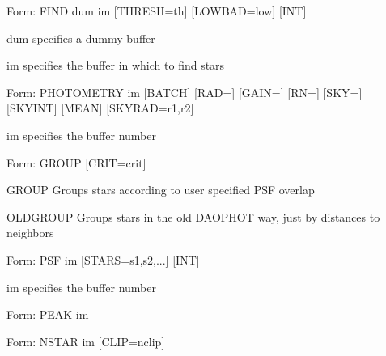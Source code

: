 {\newpage\clearpage
{}%
\begin{command}
  \item[Form: FIND dum im {[THRESH=th]} {[LOWBAD=low]} {[INT]}\hfill]{}
  \item[dum]{specifies a dummy buffer}
  \item[im]{specifies the buffer in which to find stars}
\end{command}%
\lthtmlfigureZ
\lthtmlcheckvsize\clearpage}

{\newpage\clearpage
{}%
\begin{command}
  \item[Form: PHOTOMETRY im {[BATCH]} {[RAD=]} {[GAIN=]} {[RN=]} {[SKY=]} {[SKYINT]} {[MEAN]} {[SKYRAD=r1,r2]}\hfill]{}
  \item[im]{specifies the buffer number}
\end{command}%
\lthtmlfigureZ
\lthtmlcheckvsize\clearpage}

{\newpage\clearpage
{}%
\begin{command}
  \item[Form: GROUP {[CRIT=crit]}\hfill]{}
  \item[GROUP]{Groups stars according to user specified PSF overlap}
  \item[OLDGROUP]{Groups stars in the old DAOPHOT way, just by distances
to neighbors}
\end{command}%
\lthtmlfigureZ
\lthtmlcheckvsize\clearpage}

{\newpage\clearpage
{}%
\begin{command}
  \item[Form: PSF im {[STARS=s1,s2,...]} {[INT]}\hfill]{}
  \item[im]{specifies the buffer number}
\end{command}%
\lthtmlfigureZ
\lthtmlcheckvsize\clearpage}

{\newpage\clearpage
{}%
\begin{command} 
  \item[Form: PEAK im\hfill]{} \end{command}%
\lthtmlfigureZ
\lthtmlcheckvsize\clearpage}

{\newpage\clearpage
{}%
\begin{command}
  \item[Form: NSTAR im  {[CLIP=nclip]}\hfill]{}
\end{command}%
\lthtmlfigureZ
\lthtmlcheckvsize\clearpage}


